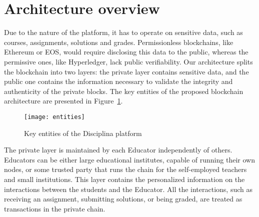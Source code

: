 \section{Architecture overview}
\label{sec:architecture}

Due to the nature of the platform, it has to operate on sensitive data, such as courses, assignments, solutions and grades. Permissionless blockchains, like Ethereum or EOS, would require disclosing this data to the public, whereas the permissive ones, like Hyperledger, lack public verifiability. Our architecture splits the blockchain into two layers: the private layer contains sensitive data, and the public one contains the information necessary to validate the integrity and authenticity of the private blocks. The key entities of the proposed blockchain architecture are presented in Figure~\ref{fig:entities}.

\begin{figure}[ht]
\centering
\texttt{[image: entities]}
\caption{Key entities of the Disciplina platform}
\label{fig:entities}
\end{figure}

The private layer is maintained by each Educator independently of others. Educators can be either large educational institutes, capable of running their own nodes, or some trusted party that runs the chain for the self-employed teachers and small institutions. This layer contains the personalized information on the interactions between the students and the Educator. All the interactions, such as receiving an assignment, submitting solutions, or being graded, are treated as transactions in the private chain.

